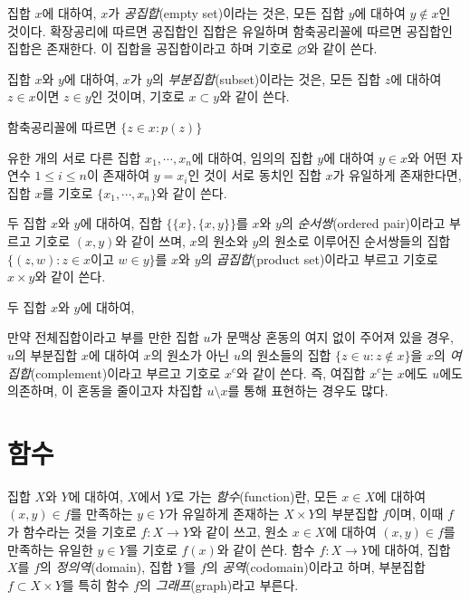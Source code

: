 \documentclass{../../large}
\begin{document}
\begin{definition}[공집합]
집합 $x$에 대하여, $x$가 \emph{공집합}(empty set)이라는 것은, 모든 집합 $y$에 대하여 $y\notin x$인 것이다.
확장공리에 따르면 공집합인 집합은 유일하며 함축공리꼴에 따르면 공집합인 집합은 존재한다.
이 집합을 공집합이라고 하며 기호로 $\varnothing$와 같이 쓴다.
\end{definition}
\begin{definition}[부분집합]
집합 $x$와 $y$에 대하여, $x$가 $y$의 \emph{부분집합}(subset)이라는 것은, 모든 집합 $z$에 대하여 $z\in x$이면 $z\in y$인 것이며, 기호로 $x\subset y$와 같이 쓴다.
\end{definition}
\begin{definition}[조건제시법]
함축공리꼴에 따르면 $\{z\in x:p(z)\}$
\end{definition}
\begin{definition}[원소나열법]
유한 개의 서로 다른 집합 $x_1,\cdots,x_n$에 대하여, 임의의 집합 $y$에 대하여 $y\in x$와 어떤 자연수 $1\le i\le n$이 존재하여 $y=x_i$인 것이 서로 동치인 집합 $x$가 유일하게 존재한다면, 집합 $x$를 기호로 $\{x_1,\cdots,x_n\}$와 같이 쓴다.
\end{definition}
\begin{definition}[곱집합]
두 집합 $x$와 $y$에 대하여, 집합 $\{\{x\},\{x,y\}\}$를 $x$와 $y$의 \emph{순서쌍}(ordered pair)이라고 부르고 기호로 $(x,y)$와 같이 쓰며, $x$의 원소와 $y$의 원소로 이루어진 순서쌍들의 집합 $\{(z,w):\text{$z\in x$이고 $w\in y$}\}$를 $x$와 $y$의 \emph{곱집합}(product set)이라고 부르고 기호로 $x\times y$와 같이 쓴다.
\end{definition}
\begin{definition}[집합의 연산]
두 집합 $x$와 $y$에 대하여, 

만약 전체집합이라고 부를 만한 집합 $u$가 문맥상 혼동의 여지 없이 주어져 있을 경우, $u$의 부분집합 $x$에 대하여 $x$의 원소가 아닌 $u$의 원소들의 집합 $\{z\in u:z\notin x\}$을 $x$의 \emph{여집합}(complement)이라고 부르고 기호로 $x^c$와 같이 쓴다.
즉, 여집합 $x^c$는 $x$에도 $u$에도 의존하며, 이 혼동을 줄이고자 차집합 $u\setminus x$를 통해 표현하는 경우도 많다.
\end{definition}





\section{함수}

\begin{definition}[함수]
집합 $X$와 $Y$에 대하여, $X$에서 $Y$로 가는 \emph{함수}(function)란, 모든 $x\in X$에 대하여 $(x,y)\in f$를 만족하는 $y\in Y$가 유일하게 존재하는 $X\times Y$의 부분집합 $f$이며, 이때 $f$가 함수라는 것을 기호로 $f:X\to Y$와 같이 쓰고, 원소 $x\in X$에 대하여 $(x,y)\in f$를 만족하는 유일한 $y\in Y$를 기호로 $f(x)$와 같이 쓴다.
함수 $f:X\to Y$에 대하여, 집합 $X$를 $f$의 \emph{정의역}(domain), 집합 $Y$를 $f$의 \emph{공역}(codomain)이라고 하며, 부분집합 $f\subset X\times Y$를 특히 함수 $f$의 \emph{그래프}(graph)라고 부른다.
\end{definition}
\end{document}
